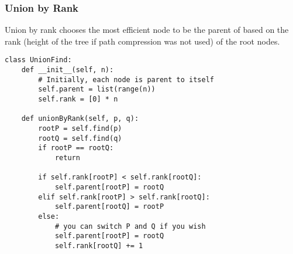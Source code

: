 \subsubsection{Union by Rank}

Union by rank chooses the most efficient node to be the parent of based on the rank (height of the tree if path compression was not used) of the root nodes.

\begin{verbatim}
class UnionFind:
    def __init__(self, n):
        # Initially, each node is parent to itself
        self.parent = list(range(n))
        self.rank = [0] * n

    def unionByRank(self, p, q):
        rootP = self.find(p)
        rootQ = self.find(q)
        if rootP == rootQ:
            return

        if self.rank[rootP] < self.rank[rootQ]:
            self.parent[rootP] = rootQ
        elif self.rank[rootP] > self.rank[rootQ]:
            self.parent[rootQ] = rootP
        else:
            # you can switch P and Q if you wish
            self.parent[rootP] = rootQ
            self.rank[rootQ] += 1
\end{verbatim}

